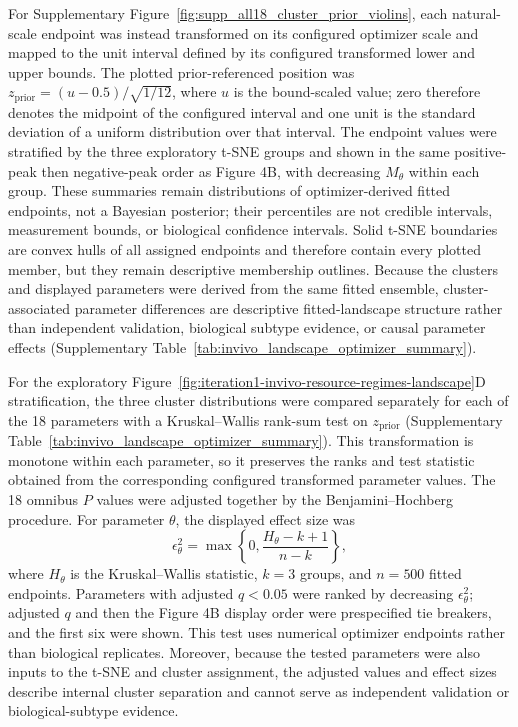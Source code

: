 \documentclass[11pt]{article}
\begin{document}
For Supplementary Figure~\ref{fig:supp_all18_cluster_prior_violins}, each natural-scale endpoint was instead transformed on its configured optimizer scale and mapped to the unit interval defined by its configured transformed lower and upper bounds. The plotted prior-referenced position was \(z_{\mathrm{prior}}=(u-0.5)/\sqrt{1/12}\), where \(u\) is the bound-scaled value; zero therefore denotes the midpoint of the configured interval and one unit is the standard deviation of a uniform distribution over that interval. The endpoint values were stratified by the three exploratory t-SNE groups and shown in the same positive-peak then negative-peak order as Figure 4B, with decreasing $M_\theta$ within each group. These summaries remain distributions of optimizer-derived fitted endpoints, not a Bayesian posterior; their percentiles are not credible intervals, measurement bounds, or biological confidence intervals. Solid t-SNE boundaries are convex hulls of all assigned endpoints and therefore contain every plotted member, but they remain descriptive membership outlines. Because the clusters and displayed parameters were derived from the same fitted ensemble, cluster-associated parameter differences are descriptive fitted-landscape structure rather than independent validation, biological subtype evidence, or causal parameter effects (Supplementary Table~\ref{tab:invivo_landscape_optimizer_summary}).

For the exploratory Figure~\ref{fig:iteration1-invivo-resource-regimes-landscape}D stratification, the three cluster distributions were compared separately for each of the 18 parameters with a Kruskal--Wallis rank-sum test on \(z_{\mathrm{prior}}\) (Supplementary Table~\ref{tab:invivo_landscape_optimizer_summary}). This transformation is monotone within each parameter, so it preserves the ranks and test statistic obtained from the corresponding configured transformed parameter values. The 18 omnibus \(P\) values were adjusted together by the Benjamini--Hochberg procedure. For parameter \(\theta\), the displayed effect size was
\begin{equation}
\epsilon^2_{\theta}
=
\max\!\left\{0,\frac{H_{\theta}-k+1}{n-k}\right\},
\label{eq:appendix_cluster_epsilon_squared}
\end{equation}
where \(H_{\theta}\) is the Kruskal--Wallis statistic, \(k=3\) groups, and \(n=500\) fitted endpoints. Parameters with adjusted \(q<0.05\) were ranked by decreasing \(\epsilon^2_{\theta}\); adjusted \(q\) and then the Figure 4B display order were prespecified tie breakers, and the first six were shown. This test uses numerical optimizer endpoints rather than biological replicates. Moreover, because the tested parameters were also inputs to the t-SNE and cluster assignment, the adjusted values and effect sizes describe internal cluster separation and cannot serve as independent validation or biological-subtype evidence.
\end{document}
